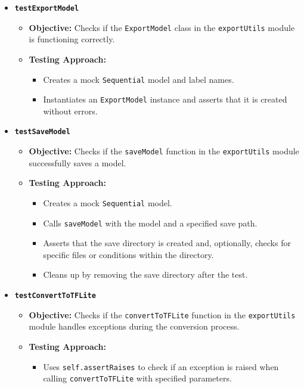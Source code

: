 \begin{itemize}
	\item \textbf{\texttt{testExportModel}}
	\begin{itemize}
		\item \textbf{Objective:} Checks if the \texttt{ExportModel} class in the \texttt{exportUtils} module is functioning correctly.
		\item \textbf{Testing Approach:}
		\begin{itemize}
			\item Creates a mock \texttt{Sequential} model and label names.
			\item Instantiates an \texttt{ExportModel} instance and asserts that it is created without errors.
		\end{itemize}
	\end{itemize}
	
	\item \textbf{\texttt{testSaveModel}}
	\begin{itemize}
		\item \textbf{Objective:} Checks if the \texttt{saveModel} function in the \texttt{exportUtils} module successfully saves a model.
		\item \textbf{Testing Approach:}
		\begin{itemize}
			\item Creates a mock \texttt{Sequential} model.
			\item Calls \texttt{saveModel} with the model and a specified save path.
			\item Asserts that the save directory is created and, optionally, checks for specific files or conditions within the directory.
			\item Cleans up by removing the save directory after the test.
		\end{itemize}
	\end{itemize}
	
	\item \textbf{\texttt{testConvertToTFLite}}
	\begin{itemize}
		\item \textbf{Objective:} Checks if the \texttt{convertToTFLite} function in the \texttt{exportUtils} module handles exceptions during the conversion process.
		\item \textbf{Testing Approach:}
		\begin{itemize}
			\item Uses \texttt{self.assertRaises} to check if an exception is raised when calling \texttt{convertToTFLite} with specified parameters.
		\end{itemize}
	\end{itemize}
\end{itemize}

